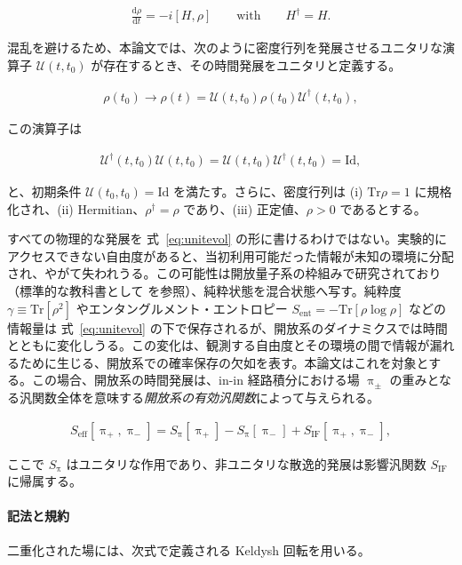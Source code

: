 \documentclass[a4paper,11pt]{ltjsarticle}
\numberwithin{equation}{section}
\newcommand{\dd}{\mathrm{d}}
\newcommand{\Eq}[1]{Eq.~(\ref{#1})}
\renewcommand{\Eq}[1]{式~\eqref{#1}}
\begin{document}
\begin{align}\label{eq:OQS}
\frac{\dd \rho }{\dd t}  = - i \left[H, \rho\right] \qquad \mathrm{with} \qquad H^\dag = H. 
\end{align}

混乱を避けるため、本論文では、次のように密度行列を発展させるユニタリな演算子 $\mathcal{U}(t,t_0)$ が存在するとき、その時間発展をユニタリと定義する。

\begin{align}\label{eq:unitevol}
\rho(t_0) \rightarrow \rho(t) = \mathcal{U}(t,t_0)  \rho(t_0) \mathcal{U}^\dag(t,t_0),
\end{align}

この演算子は

\begin{align}
\mathcal{U}^\dag(t,t_0) \mathcal{U}(t,t_0)  = \mathcal{U}(t,t_0)    \mathcal{U}^\dag(t,t_0) =  \mathrm{Id},
\end{align}

と、初期条件 $\mathcal{U}(t_0,t_0) = \mathrm{Id}$ を満たす。さらに、密度行列は (i) $\mathrm{Tr}\rho=1$ に規格化され、(ii) Hermitian、$\rho^\dag=\rho$ であり、(iii) 正定値、$\rho>0$ であるとする。

すべての物理的な発展を \Eq{eq:unitevol} の形に書けるわけではない。実験的にアクセスできない自由度があると、当初利用可能だった情報が未知の環境に分配され、やがて失われうる。この可能性は開放量子系の枠組みで研究されており（標準的な教科書として \cite{breuerTheoryOpenQuantum2002} を参照）、純粋状態を混合状態へ写す。純粋度 $\gamma\equiv\mathrm{Tr}[\rho^2]$ やエンタングルメント・エントロピー $S_{\mathrm{ent}}=-\mathrm{Tr}[\rho\log\rho]$ などの情報量は \Eq{eq:unitevol} の下で保存されるが、開放系のダイナミクスでは時間とともに変化しうる。この変化は、観測する自由度とその環境の間で情報が漏れるために生じる、開放系での確率保存の欠如を表す。本論文はこれを対象とする。この場合、開放系の時間発展は、in-in 経路積分における場 $\uppi_\pm$ の重みとなる汎関数全体を意味する\textit{開放系の有効汎関数}によって与えられる。

\begin{align}\label{eq:Seffintro}
S_{\mathrm{eff}}\left[ \uppi_+, \uppi_-\right] = S_\uppi\left[\uppi_+\right] - S_\uppi\left[\uppi_-\right] + S_{\mathrm{IF}}\left[\uppi_+,\uppi_- \right],
\end{align}

ここで $S_\uppi$ はユニタリな作用であり、非ユニタリな散逸的発展は影響汎関数 $S_{\mathrm{IF}}$ \cite{FEYNMAN1963118} に帰属する。

\paragraph{記法と規約} 二重化された場には、次式で定義される Keldysh 回転を用いる。
\end{document}

